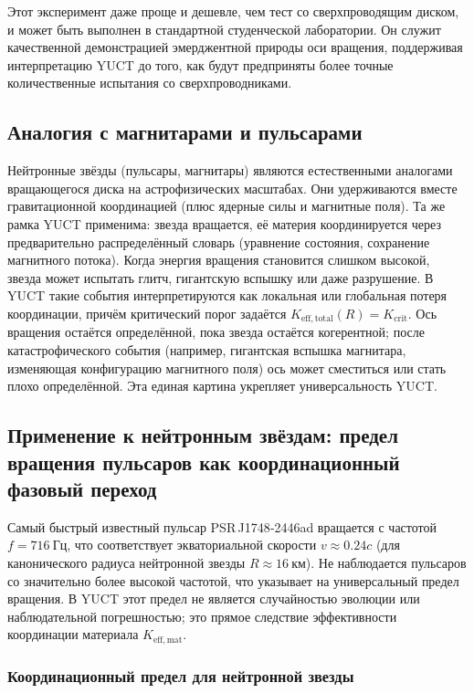 \documentclass[12pt,a4paper]{article}
\newcommand{\Kefftot}{K_{\mathrm{eff,total}}}
\newcommand{\Kcrit}{K_{\mathrm{crit}}}
\begin{document}
	Этот эксперимент даже проще и дешевле, чем тест со сверхпроводящим диском, и может быть выполнен в стандартной студенческой лаборатории. Он служит качественной демонстрацией эмерджентной природы оси вращения, поддерживая интерпретацию YUCT до того, как будут предприняты более точные количественные испытания со сверхпроводниками.
	
	\subsection{Аналогия с магнитарами и пульсарами}
	
	Нейтронные звёзды (пульсары, магнитары) являются естественными аналогами вращающегося диска на астрофизических масштабах. Они удерживаются вместе гравитационной координацией (плюс ядерные силы и магнитные поля). Та же рамка YUCT применима: звезда вращается, её материя координируется через предварительно распределённый словарь (уравнение состояния, сохранение магнитного потока). Когда энергия вращения становится слишком высокой, звезда может испытать глитч, гигантскую вспышку или даже разрушение. В YUCT такие события интерпретируются как локальная или глобальная потеря координации, причём критический порог задаётся \(\Kefftot(R) = \Kcrit\). Ось вращения остаётся определённой, пока звезда остаётся когерентной; после катастрофического события (например, гигантская вспышка магнитара, изменяющая конфигурацию магнитного поля) ось может сместиться или стать плохо определённой. Эта единая картина укрепляет универсальность YUCT.
	
	\subsection{Применение к нейтронным звёздам: предел вращения пульсаров как координационный фазовый переход}
	
	Самый быстрый известный пульсар PSR J1748‑2446ad вращается с частотой \(f = 716\ \text{Гц}\), что соответствует экваториальной скорости \(v \approx 0.24c\) (для канонического радиуса нейтронной звезды \(R\approx 16\ \text{км}\)). Не наблюдается пульсаров со значительно более высокой частотой, что указывает на универсальный предел вращения. В YUCT этот предел не является случайностью эволюции или наблюдательной погрешностью; это прямое следствие эффективности координации материала \(K_{\mathrm{eff,mat}}\).
	
	\subsubsection{Координационный предел для нейтронной звезды}
	
\end{document}

